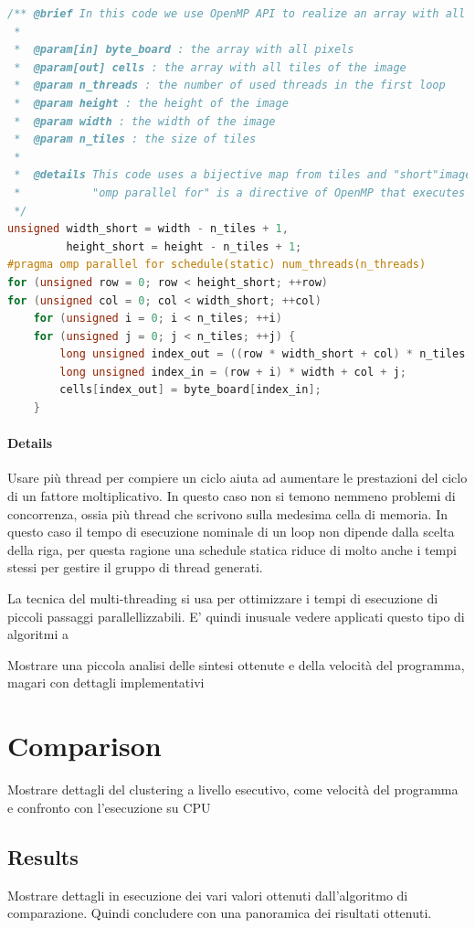 \begin{toDo}
\begin{lstlisting}[style=code, language=C, rulecolor=\color{blue}]
/** @brief In this code we use OpenMP API to realize an array with all tiles.
 *
 *  @param[in] byte_board : the array with all pixels
 *  @param[out] cells : the array with all tiles of the image
 *  @param n_threads : the number of used threads in the first loop
 *  @param height : the height of the image
 *  @param width : the width of the image
 *  @param n_tiles : the size of tiles
 *
 *  @details This code uses a bijective map from tiles and "short"image, i.e. an image with shape width_short, height_short. Each tiles will be assigned to its first pixel (up/sx).
 *           "omp parallel for" is a directive of OpenMP that executes a for cycle using more indipendent threads. In this case the schedule is "static" i.e. each thread knows in advance all its loops.
 */
unsigned width_short = width - n_tiles + 1,
         height_short = height - n_tiles + 1;
#pragma omp parallel for schedule(static) num_threads(n_threads)
for (unsigned row = 0; row < height_short; ++row)
for (unsigned col = 0; col < width_short; ++col)
    for (unsigned i = 0; i < n_tiles; ++i)
    for (unsigned j = 0; j < n_tiles; ++j) {
        long unsigned index_out = ((row * width_short + col) * n_tiles + i) * n_tiles + j; // [row-i, col-j, i,j]
        long unsigned index_in = (row + i) * width + col + j;
        cells[index_out] = byte_board[index_in];
    }\end{lstlisting}

    \paragraph{Details}
    Usare più \gls{thread} per compiere un ciclo aiuta ad aumentare le prestazioni del ciclo di un fattore moltiplicativo. In questo caso non si temono nemmeno problemi di concorrenza, ossia più \gls{thread} che scrivono sulla medesima cella di memoria. In questo caso il tempo di esecuzione nominale di un loop non dipende dalla scelta della riga, per questa ragione una schedule statica riduce di molto anche i tempi stessi per gestire il gruppo di thread generati.

    \noindent La tecnica del multi-threading si usa per ottimizzare i tempi di esecuzione di piccoli passaggi parallellizzabili. E' quindi inusuale vedere applicati questo tipo di algoritmi a

    Mostrare una piccola analisi delle sintesi ottenute e della velocità del programma, magari con dettagli implementativi
    \section{Comparison}
   		Mostrare dettagli del clustering a livello esecutivo, come velocità del programma e confronto con l'esecuzione su CPU
    	\subsection{Results}
    		Mostrare dettagli in esecuzione dei vari valori ottenuti dall'algoritmo di comparazione. Quindi concludere con una panoramica dei risultati ottenuti.
\end{toDo}



